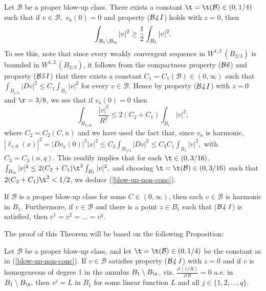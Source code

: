 \documentclass[a4paper,11pt]{amsart}
\begin{document}
Let ${\mathcal B}$ be a proper blow-up class. There exists a   constant $\t = \t({\mathcal B}) \in (0, 1/4)$ such that 
if $v \in {\mathcal B},$ $v_{a}(0) = 0$ and property (${\mathcal B}{\emph 4 \, I}$) holds with $z =0$, then 
\begin{equation}\label{blow-up-non-conc}
\int_{B_{1} \setminus B_{\t}}|v|^{2} \geq \frac{1}{2}\int_{B_{1}}|v|^{2}.
\end{equation}  
To see this, note that since every weakly convergent sequence in $W^{1, 2} \, (B_{2/3})$ is bounded in $W^{1,2} \, (B_{2/3})$, it follows from the compactness property (${\mathcal B}{\emph 6}$) and property (${\mathcal B}{\emph 5 \, I}$) that there exists a constant $C_{1}= C_{1}({\mathcal B}) \in (0, \infty)$ 
such that $\int_{B_{1/4}}|Dv|^{2} \leq C_{1}\int_{B_{1}}|v|^{2}$ for every $v \in {\mathcal B}.$ Hence by property (${\mathcal B}{\emph 4 \, I}$) with $z = 0$ and $\r  = 3/8$, we see that if $v_{a}(0) = 0$ then 
$$\int_{B_{3/16}} \frac{|v|^{2}}{R^{2}} \leq 2(C_{2} + C_{1})\int_{B_{1}}|v|^{2},$$ where $C_{2} = C_{2}(C, n)$ and we have used 
the fact that, since $v_{a}$ is harmonic, $|\ell_{v, 0}(x)|^{2}= |Dv_{a}(0)|^{2}|x|^{2} \leq C_{3}\int_{B_{1/4}}|Dv|^{2} \leq C_{3}C_{1}\int_{B_{1}}|v|^{2},$ with $C_{3} = C_{3}(n, q).$  
This readily implies that for each $\t \in (0, 3/16)$, $\int_{B_{\t}}|v|^{2} \leq 2(C _{2}+ C_{1}) \t^{2}\int_{B_{1}}|v|^{2},$ and choosing 
$\t = \t({\mathcal B}) \in (0, 3/16)$ such that  $2(C_{2} + C_{1})\t^{2} < 1/2$, we deduce (\ref{blow-up-non-conc}).
  



\begin{theorem}\label{blowup-reg}
If ${\mathcal B}$ is a proper blow-up class for some $C \in (0, \infty)$, then 
each $v \in {\mathcal B}$ is harmonic in $B_{1}$. Furthermore, if $v \in {\mathcal B}$ and there is a point $z \in B_{1}$ such that 
(${\mathcal B{\it{4} \, I}}$) is satisfied, then $v^{1} = v^{2} = \ldots = v^{q}.$
\end{theorem}    


The proof of this Theorem will be based on the following Proposition: 


\begin{proposition}\label{homog}
Let ${\mathcal B}$ be a proper blow-up class, and let $\t = \t({\mathcal B}) \in (0, 1/4)$ be the constant as in (\ref{blow-up-non-conc}). If $v \in {\mathcal B}$  satisfies property (${\mathcal B}{\it{4} \, I}$) with $z = 0$ and if $v$ is homogeneous of degree 1
in the annulus $B_{1} \setminus B_{\t}$, viz. $\frac{\partial \, \left(v/R\right)}{\partial \, R} = 0$ a.e. in $B_{1} \setminus B_{\t},$ then $v^{j} = L$ in $B_{1}$ for some linear function $L$ and all $j \in \{1, 2, \ldots, q\}.$ 
\end{proposition}
\end{document}
